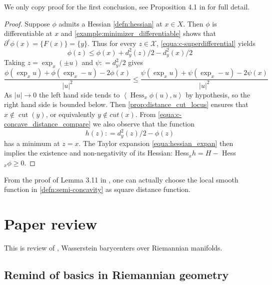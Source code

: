 We only copy proof for the first conclusion, see Proposition 4.1 in \cite{cordero2001riemannian} for full detail.
\begin{proof}
	Suppose \( \phi \) admits a Hessian \cref{defn:hessian} at \( x \in X \).
	Then \( \phi \) is differentiable at \( x \) and
	\cref{example:minimizer_differentiable} shows that \( \partial ^ { c } \phi ( x ) = \{ F ( x ) \} = \{ y \} \).
	Thus for every \( z \in \mathcal { X } \), \cref{equa:c-superdifferential} yields
	\begin{equation}
		\label{equa:c-concave_distance_compare}
		\phi ( z ) \leq \phi ( x ) + d _ { y } ^ { 2 } ( z ) / 2 - d _ { y } ^ { 2 } ( x ) / 2 \end{equation}
	Taking \( z = \exp _ { x } ( \pm u ) \) and \( \psi : = d _ { y } ^ { 2 } / 2 \) gives
	\[ \frac { \phi \left( \exp _ { x } u \right) + \phi \left( \exp _ { x } - u \right) - 2 \phi ( x ) } { | u | ^ { 2 } } \leq \frac { \psi \left( \exp _ { x } u \right) + \psi \left( \exp _ { x } - u \right) - 2 \psi ( x ) } { | u | ^ { 2 } } \]
	As \( | u | \rightarrow 0 \) the left hand side tends to \( \left\langle \operatorname { Hess } _ { x } \phi ( u ) , u \right\rangle \) by hypothesis, so the right hand side is bounded below.
	Then \cref{prop:distance_cut_locus} ensures that
	\( x \notin \operatorname { cut } ( y ) \), or equivalently \( y \notin c u t ( x ) \).
	From \cref{equa:c-concave_distance_compare} we also observe that the function
	\[ h ( z ) : = d _ { y } ^ { 2 } ( z ) / 2 - \phi ( z ) \]
	has a minimum at \( z = x \). The Taylor expansion \cref{equa:hessian_expan} then implies the
	existence and non-negativity of its Hessian: Hess\(_{ x } h = H - \) Hess\(_ { x } \phi \geq 0\).
\end{proof}

From the proof of Lemma 3.11 in \cite{cordero2001riemannian}, one can actually choose the local smooth function in \cref{defn:semi-concavity} as square distance function.
\section{Paper review}

This is review of \cite{KIM2017640},
Wasserstein barycenters over Riemannian manifolds.

\subsection{Remind of basics in Riemannian geometry}

